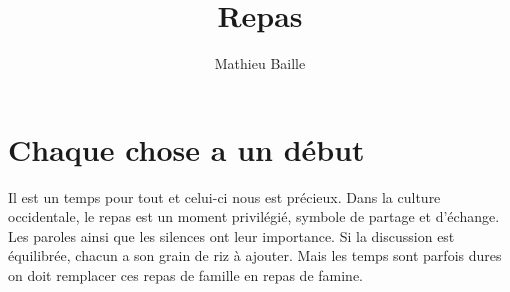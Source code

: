 \documentclass{report}
\title{Repas}
\author{Mathieu Baille}
\begin{document}
\maketitle
\chapter{Chaque chose a un début}
\noindent Il est un temps pour tout et celui-ci nous est précieux. Dans la culture occidentale, le repas est un moment privilégié, symbole de partage et d'échange. Les paroles ainsi que les silences ont leur importance. Si la discussion est équilibrée, chacun a son grain de riz à ajouter. Mais les temps sont parfois dures on doit remplacer ces repas de famille en repas de famine.
\end{document}
